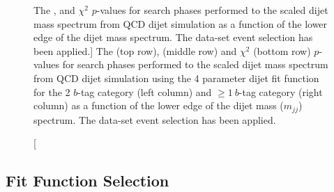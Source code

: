 \begin{figure}[!htb]
\begin{center}
  \end{center}
  \vspace{-1em}
  \caption
      [The \bh{},  \dhunt{}  and $\chi^{2}$ \mbox{$p$-value}s
      for search phases performed to the scaled dijet mass spectrum from QCD dijet simulation
      as a function of the lower edge of the dijet mass spectrum.
      The \summer{} data-set event selection has been applied.]
      {The \bh{} (top row),  \dhunt{} (middle row) and $\chi^{2}$ (bottom row) \mbox{$p$-value}s
       for search phases performed to the scaled dijet mass spectrum from QCD dijet simulation
       using the 4 parameter dijet fit function
       for the 2 $b$-tag category (left column) and $\geq1~b$-tag category (right column)
       as a function of the lower edge of the dijet mass ($m_{jj}$) spectrum.
       The \summer{} data-set event selection has been applied.}
  \label{fig:mjjGraphs}
\end{figure}


\FloatBarrier
\vfill
\clearpage
\subsection{Fit Function Selection}
\label{sec:bkg-summer_wilks}

